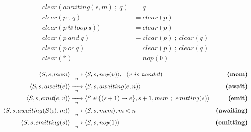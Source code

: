 \begin{figure}[h!]
{\small
\begin{align*}
  clear( awaiting(\epsilon,m)~;~q ) &= q                   \\
  clear( p~;~q )                    &= clear(p)            \\
  clear( p~@~loop~q) )              &= clear(p)            \\
  clear( p~and~q )                  &= clear(p)~;~clear(q) \\
  clear( p~or~q )                   &= clear(p)~;~clear(q) \\
  clear( * )                        &= nop(0)
\end{align*}
}%
\end{figure}

\begin{align*}
\langle S,s, mem \rangle &\xrightarrow[~n~]{}
\langle S,s, nop(v) \rangle,~~(v~is~nondet)
    & \textbf{(mem)}        \\
\langle S,s, await(e) \rangle &\xrightarrow[~n~]{}
\langle S,s, awaiting(e,n) \rangle
    & \textbf{(await)}      \\
\langle S,s, emit(e,v) \rangle &\xrightarrow[~n~]{}
\langle S \uplus \{(s+1) \mapsto e\},s+1, mem~;~emitting(s) \rangle
    & \textbf{(emit)}       \\
\langle S,s, awaiting(S(s),m) \rangle &\xrightarrow[~n~]{}
\langle S,s, mem \rangle, m<n
    & \textbf{(awaiting)}   \\
\langle S,s, emitting(s) \rangle &\xrightarrow[~n~]{}
\langle S,s, nop(1) \rangle
    & \textbf{(emitting)}   \\
\end{align*}

